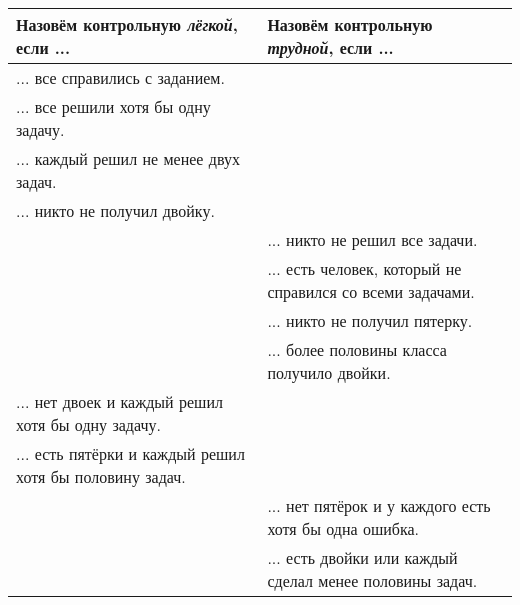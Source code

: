 
\begin{center}
\begin{tabular}{|m{8.5cm}|m{8.5cm}|}
\hline
Назовём контрольную \textit{лёгкой}, если ... & Назовём контрольную \textit{трудной}, если ... \\
\hline
... все справились с заданием. & \\
\hline
... все решили хотя бы одну задачу. & \\
\hline
... каждый решил не менее двух задач. & \\
\hline
... никто не получил двойку. & \\
\hline
& ... никто не решил все задачи. \\
\hline
 & ... есть человек, который не справился со всеми задачами. \\
\hline
& ... никто не получил пятерку. \\
\hline
& ... более половины класса получило двойки. \\
\hline
... нет двоек и каждый решил хотя бы одну задачу. & \\
\hline
... есть пятёрки и каждый решил хотя бы половину задач. & \\
\hline
& ... нет пятёрок и у каждого есть хотя бы
одна ошибка. \\
\hline
& ... есть двойки или каждый сделал
менее половины задач. \\
\hline
\end{tabular}    
\end{center}
